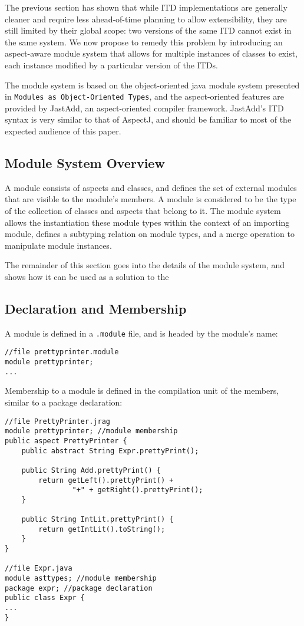 The previous section has shown that while ITD implementations are generally
cleaner and require less ahead-of-time planning to allow extensibility, they
are still limited by their global scope: two versions of the same ITD cannot
exist in the same system. We now propose to remedy this problem by introducing
an aspect-aware module system that allows for multiple instances of classes
to exist, each instance modified by a particular version of the ITDs.

The module system is based on the object-oriented java module system 
presented in \texttt{Modules as Object-Oriented Types}\cite{modulesastypes},
and the aspect-oriented features are provided by JastAdd\cite{jastadd, jastaddjavacompiler}, 
an aspect-oriented compiler framework. JastAdd's ITD syntax is very similar
to that of AspectJ, and should be familiar to most of the expected audience
of this paper.

\subsection{Module System Overview}

A module consists of aspects and classes, and defines the set of external
modules that are visible to the module's members. 
A module is considered to be the type of the collection of classes and aspects
that belong to it. The module system allows the instantiation these module types
within the context of an importing module, defines a subtyping relation
on module types, and a merge operation to manipulate module instances.

The remainder of this section goes into the details of the module system, and shows
how it can be used as a solution to the 

\subsection{Declaration and Membership}

A module is defined in a \texttt{.module} file, and is headed by the module's name:

\begin{lstlisting}[caption={Module Declaration}]
//file prettyprinter.module
module prettyprinter;
...
\end{lstlisting}

Membership to a module is defined in the compilation unit of the members,
similar to a package declaration:

\begin{lstlisting}[caption={Module Membership}]
//file PrettyPrinter.jrag
module prettyprinter; //module membership
public aspect PrettyPrinter {
	public abstract String Expr.prettyPrint();
	
	public String Add.prettyPrint() {
		return getLeft().prettyPrint() + 
				"+" + getRight().prettyPrint();
	}
	
	public String IntLit.prettyPrint() {
		return getIntLit().toString();
	}
}

//file Expr.java
module asttypes; //module membership
package expr; //package declaration
public class Expr {
...
}
\end{lstlisting}

